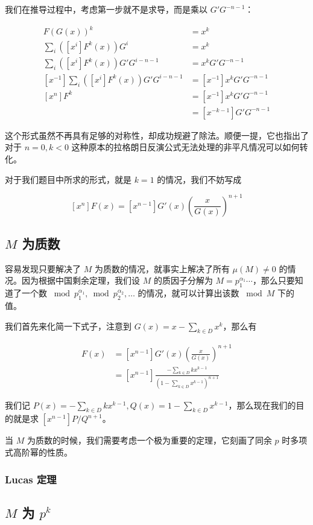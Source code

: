 \documentclass[12pt]{ctexart}
\begin{document}
我们在推导过程中，考虑第一步就不是求导，而是乘以 $G'G^{-n-1}$：

\begin{align*}
F(G(x))^k &= x^k\\
\sum_i ([x^i]F^k(x))G^i &= x^k\\
\sum_i ([x^i]F^k(x))G'G^{i-n-1} &= x^k G'G^{-n-1}\\
[x^{-1}]\sum_i ([x^i]F^k(x))G'G^{i-n-1} &= [x^{-1}]x^k G'G^{-n-1}\\
[x^n]F^k &= [x^{-1}]x^k G'G^{-n-1}\\
&= [x^{-k-1}]G'G^{-n-1}
\end{align*}

这个形式虽然不再具有足够的对称性，却成功规避了除法。顺便一提，它也指出了对于 $n=0,k<0$ 这种原本的拉格朗日反演公式无法处理的非平凡情况可以如何转化。

对于我们题目中所求的形式，就是 $k=1$ 的情况，我们不妨写成

$$
[x^n]F(x) = [x^{n-1}]G'(x)\left(\frac {x}{G(x)}\right)^{n+1}
$$

\subsection{$M$ 为质数}

容易发现只要解决了 $M$ 为质数的情况，就事实上解决了所有 $\mu(M) \neq0 $ 的情况。因为根据中国剩余定理，我们设 $M$ 的质因子分解为 $M=p_1^{\alpha_1} \cdots$，那么只要知道了一个数 $\bmod p_1^{\alpha_1}, \bmod p_2^{\alpha_2},\dots$ 的情况，就可以计算出该数 $\bmod M$ 下的值。

我们首先来化简一下式子，注意到 $G(x)= x-\sum_{k\in D}x^k$，那么有

\begin{align*}
[x^n]F(x) &=[x^{n-1}] G'(x)\left(\frac {x}{G(x)}\right)^{n+1}\\
&= [x^{n-1}] \frac{-\sum_{k\in D} kx^{k-1}}{(1-\sum_{k\in D} x^{k-1})^{n+1}}
\end{align*}

我们记 $P(x)=-\sum_{k\in D} kx^{k-1}, Q(x)=1-\sum_{k\in D} x^{k-1}$，那么现在我们的目的就是求 $[x^{n-1}] P/Q^{n+1}$。

当 $M$ 为质数的时候，我们需要考虑一个极为重要的定理，它刻画了同余 $p$ 时多项式高阶幂的性质。

\subsubsection{Lucas 定理}

\subsection{$M$ 为 $p^k$}
\end{document}
